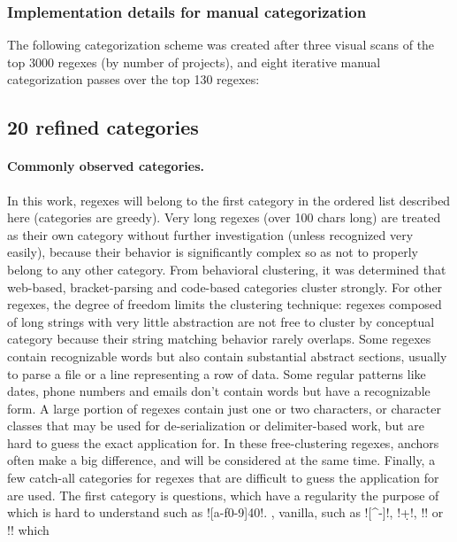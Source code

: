 \subsubsection{Implementation details for manual categorization}
The following categorization scheme was created after three visual scans of the top 3000 regexes (by number of projects), and eight iterative manual categorization passes over the top 130 regexes:

\subsection{20 refined categories}
\label{sec:20refinedCategories}

\paragraph{Commonly observed categories.} In this work, regexes will belong to the first category in the ordered list described here (categories are greedy).  Very long regexes (over 100 chars long) are treated as their own category without further investigation (unless recognized very easily), because their behavior is significantly complex so as not to properly belong to any other category.  From behavioral clustering, it was determined that web-based, bracket-parsing and code-based categories cluster strongly.  For other regexes, the degree of freedom limits the clustering technique: regexes composed of long strings with very little abstraction are not free to cluster by conceptual category because their string matching behavior rarely overlaps.  Some regexes contain recognizable words but also contain substantial abstract sections, usually to parse a file or a line representing a row of data.  Some regular patterns like dates, phone numbers and emails don't contain words but have a recognizable form.  A large portion of regexes contain just one or two characters, or character classes that may be used for de-serialization or delimiter-based work, but are hard to guess the exact application for.  In these free-clustering regexes, anchors often make a big difference, and will be considered at the same time.  Finally, a few catch-all categories for regexes that are difficult to guess the application for are used.  The first category is questions, which have a regularity the purpose of which is hard to understand such as \cverb![a-f0-9]{40}!.  , vanilla, such as \cverb![^\w\s-]!, \cverb!\d+!, \cverb!! or \cverb!! which


